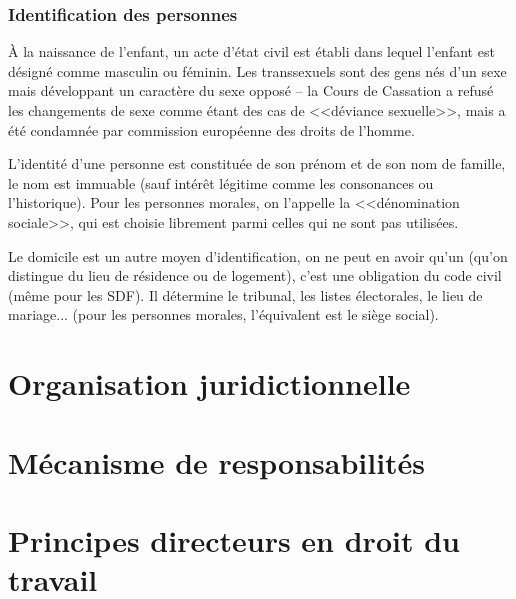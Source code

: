 \documentclass[10pt,a4paper]{article}
\begin{document}
\section{Identification des personnes}

À la naissance de l'enfant, un acte d'état civil est établi dans lequel l'enfant est désigné comme masculin ou féminin. Les transsexuels sont des gens nés d'un sexe mais développant un caractère du sexe opposé -- la Cours de Cassation a refusé les changements de sexe comme étant des cas de <<déviance sexuelle>>, mais a été condamnée par commission européenne des droits de l'homme.

L'identité d'une personne est constituée de son prénom et de son nom de famille, le nom est immuable (sauf intérêt légitime comme les consonances ou l'historique). Pour les personnes morales, on l'appelle la <<dénomination sociale>>, qui est choisie librement parmi celles qui ne sont pas utilisées.

Le domicile est un autre moyen d'identification, on ne peut en avoir qu'un (qu'on distingue du lieu de résidence ou de logement), c'est une obligation du code civil (même pour les SDF). Il détermine le tribunal, les listes électorales, le lieu de mariage... (pour les personnes morales, l'équivalent est le siège social).

\part{Organisation juridictionnelle}

\part{Mécanisme de responsabilités}

\part{Principes directeurs en droit du travail}
\end{document}
